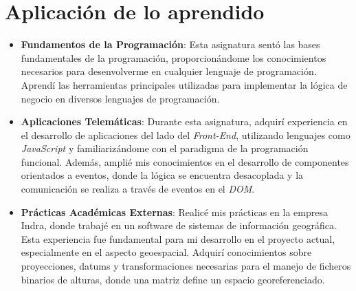 \documentclass[a4paper, 11pt]{book}
\begin{document}
\section{Aplicación de lo aprendido}
\label{sec:aplicacion}
\begin{itemize}
	\item \textbf{Fundamentos de la Programación}: Esta asignatura sentó las bases fundamentales de la programación, proporcionándome los conocimientos necesarios para desenvolverme en cualquier lenguaje de programación. Aprendí las herramientas principales utilizadas para implementar la lógica de negocio en diversos lenguajes de programación.
	\item \textbf{Aplicaciones Telemáticas}: Durante esta asignatura, adquirí experiencia en el desarrollo de aplicaciones del lado del \emph{Front-End}, utilizando lenguajes como \emph{JavaScript} y familiarizándome con el paradigma de la programación funcional. Además, amplié mis conocimientos en el desarrollo de componentes orientados a eventos, donde la lógica se encuentra desacoplada y la comunicación se realiza a través de eventos en el \emph{DOM}.
	\item \textbf{Prácticas Académicas Externas}: Realicé mis prácticas en la empresa Indra, donde trabajé en un software de sistemas de información geográfica. Esta experiencia fue fundamental para mi desarrollo en el proyecto actual, especialmente en el aspecto geoespacial. Adquirí conocimientos sobre proyecciones, datums y transformaciones necesarias para el manejo de ficheros binarios de alturas, donde una matriz define un espacio georeferenciado.
\end{itemize}
\end{document}
